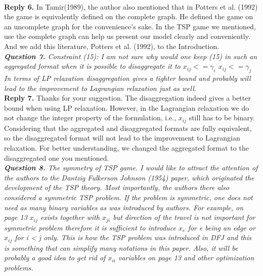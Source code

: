 \documentclass[11pt]{article}
\begin{document}
\\[2mm]
\noindent \textbf{Reply 6.}
In Tamir(1989), the author also mentioned that in Potters et al. (1992) the game is equivalently defined on the complete graph.
He defined the game on an uncomplete graph for the convenience's sake.
In the TSP game we mentioned, use the complete graph can help us present our model clearly and conveniently. And we add this literature, Potters et al. (1992), to the Introduction.
\\[4mm]
\noindent \textit{\textbf{Question 7.}
Constraint (15): I am not sure why would one keep (15) in such an aggregated format when it is possible to disaggregate it to
$x_{ij} <= \gamma_i$
$x_{ij} <= \gamma_j$
In terms of LP relaxation disaggregation gives a tighter bound and probably will lead to the improvement to Lagrangian relaxation just as well.}
\\[2mm]
\noindent \textbf{Reply 7.}
Thanks for your suggestion.
The disaggregation indeed gives a better bound when using LP relaxation.
However, in the Lagrangian relaxation we do not change the integer property of the formulation, i.e., $x_{ij}$ still has to be binary.
Considering that the aggregated and disaggregated formats are fully equivalent, so the disaggregated format will not lead to the improvement to Lagrangian relaxation.
For better understanding, we changed the aggregated format to the disaggregated one you mentioned.
\\[4mm]
\noindent \textit{\textbf{Question 8.}
The symmetry of TSP game. I would like to attract the attention of the authors to the Dantzig Fulkerson Johnson (1954) paper, which originated the development of the TSP theory. Most importantly, the authors there also considered a symmetric TSP problem. If the problem is symmetric, one does not need as many binary variables as was introduced by authors. For example, on page 13 $x_{ij}$ exists together with $x_{ji}$ but direction of the travel is not important for symmetric problem therefore it is sufficient to introduce $x_e$ for e being an edge or $x_{ij}$ for i < j only. This is how the TSP problem was introduced in DFJ and this is something that can simplify many notations in this paper. Also, it will be probably a good idea to get rid of $x_{ii}$ variables on page 13 and other optimization problems.}
\end{document}
